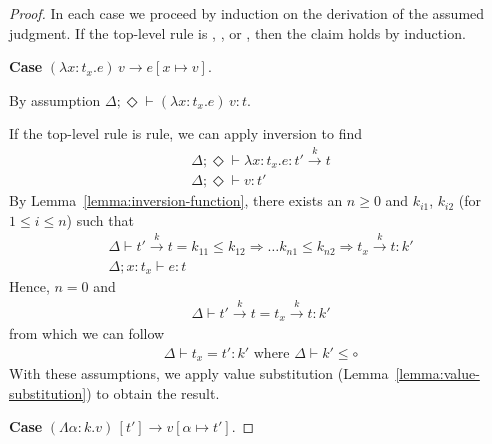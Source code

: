 \documentclass{article}
\newcommand{\ONE}{\circ}
\newcommand{\TASS}[1]{#1\colon\!}
\newcommand{\TVAR}{\alpha}
\newcommand{\LAM}[2]{\lambda\TASS{#1}#2.}
\newcommand{\APP}[1]{#1\,}
\newcommand{\TLAM}[2]{\Lambda\TASS{#1}#2.}
\newcommand{\TAPP}[2]{#1\,[#2]}
\newcommand{\KENV}{\Delta}
\newcommand{\TENVEMPTY}{\Diamond}
\newcommand\stepsto{\longrightarrow}
\begin{document}
\begin{proof}
  In each case we proceed by induction on the derivation of the
  assumed judgment.  If the top-level rule is ,
  , or , then the claim holds by
  induction.

  \textbf{Case} ${\APP{(\LAM x {t_x} e)}v \stepsto e[x \mapsto v]}$.

  By assumption $\KENV;\TENVEMPTY \vdash \APP{(\LAM x {t_x} e)}v : t$.


  If the top-level rule is  rule, we can apply inversion to find
  \begin{gather}
    \label{eq:1}
    \KENV; \TENVEMPTY \vdash \LAM x {t_x} e : t' \stackrel{k}\to t
    \\
    \label{eq:2}
    \KENV; \TENVEMPTY \vdash v : t'
  \end{gather}
  By Lemma~\ref{lemma:inversion-function}, there exists an $n\ge0$ and $k_{i1}$, $k_{i2}$ (for $1\le i\le n$) such that
  \begin{gather}
    \KENV \vdash t' \stackrel{k}\to t = k_{11}\le k_{12}\Rightarrow \dots k_{n1}\le k_{n2} \Rightarrow t_x \stackrel{k}\to t : k'
    \\
    \KENV; \TASS x{t_x} \vdash e : t
  \end{gather}
  Hence, $n=0$ and 
  \begin{gather}
    \KENV \vdash t' \stackrel{k}\to t = t_x \stackrel{k}\to t : k'
  \end{gather}
  from which we can follow
  \begin{gather}
    \label{eq:3}
    \KENV \vdash t_x = t' : k' \text{ where } \KENV \vdash k' \le \ONE
  \end{gather}
  With these assumptions, we apply value substitution
  (Lemma~\ref{lemma:value-substitution}) to obtain the result.

  \textbf{Case} $\TAPP{(\TLAM \TVAR k v)}{t'} \stepsto v[\TVAR \mapsto t']$.


\end{proof}
\end{document}
